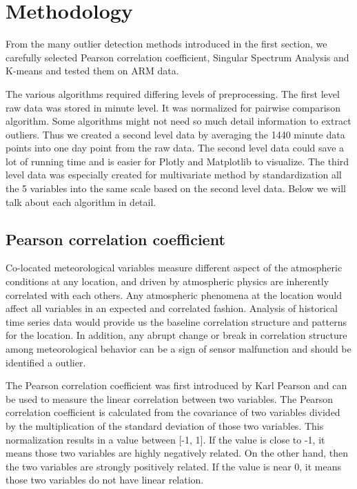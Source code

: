 \section{Methodology}
From the many outlier detection methods introduced in the first section,
we carefully selected Pearson correlation coefficient, Singular
Spectrum Analysis and K-means and tested them on ARM data. 

The
various algorithms required differing levels of preprocessing. The
first level raw data was stored in minute level. It was normalized
for pairwise comparison algorithm. Some algorithms might not need
so much detail information to extract outliers. Thus we created a
second level data by averaging the 1440 minute data points into one
day point from the raw data. The second level data could save a lot
of running time and is easier for Plotly \cite{plotly} and
Matplotlib \cite{Hunter:2007} to visualize. The third level data
was especially created for multivariate method by standardization
all the 5 variables into the same scale based on the second level
data. Below we will talk about each algorithm in detail. 

\subsection{Pearson correlation coefficient}
Co-located meteorological variables measure different aspect of the
atmospheric conditions at any location, and driven by atmospheric physics
are inherently correlated with each others. Any atmospheric phenomena at
the location would affect all variables in an expected
and correlated fashion.  Analysis of historical time
series data would provide us the baseline correlation structure and
patterns for the location. In addition, any abrupt change or break in
correlation structure among meteorological behavior can be a sign of
sensor malfunction and should be identified a outlier. 

The Pearson correlation coefficient was first introduced by Karl
Pearson\cite{pearson1895note} and can be used to measure the linear
correlation between two variables. The Pearson correlation coefficient
is calculated from the covariance of two variables divided by the
multiplication of the standard deviation of those two variables. This
normalization results in a value between [-1, 1]. If the value is close
to -1, it means those two variables are highly negatively related. On
the other hand, then the two variables are strongly positively related.
If the value is near 0, it means those two variables do not have linear
relation. 

